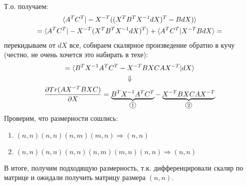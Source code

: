 \begin{solution}
    Т.о. получаем:
    \begin{gather}
        \braket{A^T C^T | -X^{-T}((X^T B^T X^{-1} dX)^T - B dX)} \\
        = \braket{A^T C^T | -X^{-T} (X^T B^T X^{-1} dX)^T} + \braket{A^T C^T | X^{-T} B dX} =
    \end{gather}
    перекидываем от $dX$ все, собираем скалярное произведение обратно в кучу (честно, не очень хочется это набирать в техе):
    \begin{gather}
        = \braket{B^T X^{-1} A^T C^T - X^{-T} B X C A X^{-T} | dX} \\
        \Downarrow \\
        \frac{\partial Tr(AX^{-T}BXC)}{\partial X} = \underbrace{B^T X^{-1} A^T C^T}_{\mathcircled{1}} - \underbrace{X^{-T} B X C A X^{-T}}_{\mathcircled{2}}
    \end{gather}
    Проверим, что размерности сошлись:
    \begin{enumerate}
        \item $(n, n)(n, n)(n, m)(m, n) \Longrightarrow (n, n)$
        \item $(n, n)(n, n)(n, n)(n, m)(m, n)(n, n) \Longrightarrow (n, n)$
    \end{enumerate}
    В итоге, получим подходящую размерность, т.к. дифференцировали скаляр по матрице и ожидали получить матрицу размера $(n, n)$.
\end{solution}
